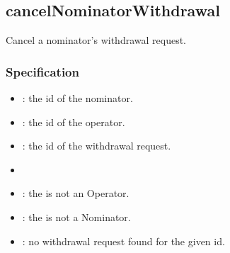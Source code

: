 \documentclass[a4paper,10pt,english]{sphinxmanual}
\begin{document}
\subsection{cancelNominatorWithdrawal}
\label{\detokenize{spec/nomination:cancelnominatorwithdrawal}}\label{\detokenize{spec/nomination:id37}}
Cancel a nominator’s withdrawal request.


\subsubsection{Specification}
\label{\detokenize{spec/nomination:id38}}


\begin{itemize}
\item {} 
: the id of the nominator.

\item {} 
: the id of the operator.

\item {} 
: the id of the withdrawal request.

\end{itemize}

\begin{itemize}
\item {} 

\end{itemize}

\begin{itemize}
\item {} 
: the  is not an Operator.

\item {} 
: the  is not a Nominator.

\item {} 
: no withdrawal request found for the given id.

\end{itemize}
\end{document}
